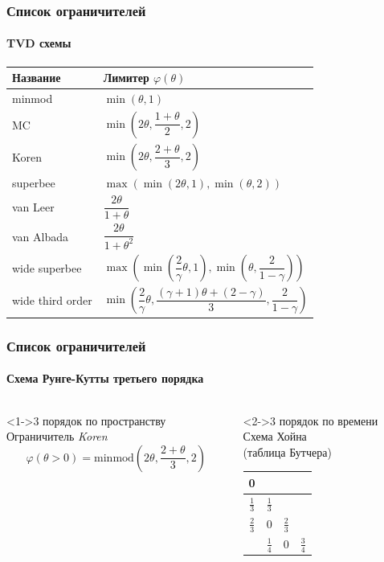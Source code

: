 \documentclass[ucs]{beamer}
\begin{document}
\begin{frame}
	\frametitle{Список ограничителей}
	\framesubtitle{TVD схемы}
	\begin{table}
		\begin{tabular}{>{\centering}p{3cm}|>{\centering}p{6cm}}
			\toprule
			Название			&  Лимитер \( \varphi(\theta) \) \tabularnewline
			\midrule
			minmod			& \( \min\left(\theta,1\right) \) \tabularnewline
			MC 				& \( \min\left(2\theta,\dfrac{1+\theta}{2},2\right) \) \tabularnewline
			Koren 			& \( \min\left(2\theta,\dfrac{2+\theta}{3},2\right) \) \tabularnewline
			superbee		 	& \( \max(\min(2\theta,1),\min(\theta,2)) \) \tabularnewline
			van Leer			& \( \dfrac{2\theta}{1+\theta} \) \tabularnewline
			van Albada		& \( \dfrac{2\theta}{1+\theta^2} \) \tabularnewline
			\midrule
			wide superbee 	& \( \max\left(\min\left(\dfrac2{\gamma}\theta,1\right),\min\left(\theta,\dfrac2{1-\gamma}\right)\right) \) \tabularnewline
			wide third order	& \( \min\left(\dfrac2{\gamma}\theta,\dfrac{(\gamma+1)\theta+(2-\gamma)}{3},\dfrac2{1-\gamma}\right) \) \tabularnewline
			\bottomrule
		\end{tabular}
	\end{table}
\end{frame}

\begin{frame}
	\frametitle{Список ограничителей}
	\framesubtitle{Схема Рунге-Кутты третьего порядка}
	\begin{columns}
		\column{.6\textwidth}
		\begin{block}<1->{3 порядок по пространству}
			\centering
			Ограничитель \textit{Koren}
			\[ \varphi(\theta>0) = \mathrm{minmod} \left(2\theta,\dfrac{2+\theta}{3},2\right) \]
		\end{block}
		\column{.4\textwidth}
		\begin{block}<2->{3 порядок по времени}
			\centering
			Схема Хойна \\ (таблица Бутчера) \\ \smallskip
			\begin{tabular}{| c | c | c | c |}
				\hline
				0 & & & \\ \hline
				\(\frac{1}{3}\) & \(\frac{1}{3}\) & & \\ \hline
				\(\frac{2}{3}\) & 0 & \(\frac{2}{3}\) & \\ \hline
				& \(\frac{1}{4}\) & 0 & \(\frac{3}{4}\) \\ \hline
			\end{tabular}
		\end{block}
	\end{columns}
	
\end{frame}
\end{document}
